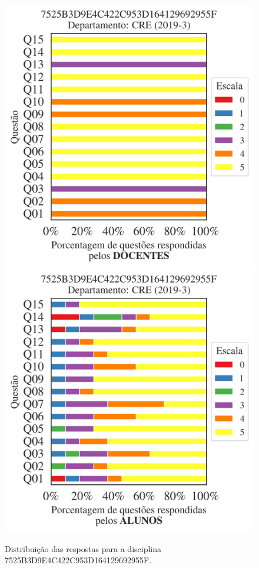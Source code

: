 \documentclass[a4paper,10pt]{article}
\begin{document}
\begin{figure}[h]
\centering
\includegraphics[width=0.485\linewidth]{analise_disciplina_departamento_CRE_7525B3D9E4C422C953D164129692955F_docentes.png}
\includegraphics[width=0.485\linewidth]{analise_disciplina_departamento_CRE_7525B3D9E4C422C953D164129692955F_alunos.png}
\caption{\label{fig:analise_geral_departamento}                Distribuição das respostas para a disciplina 7525B3D9E4C422C953D164129692955F. }
\end{figure}
\end{document}
